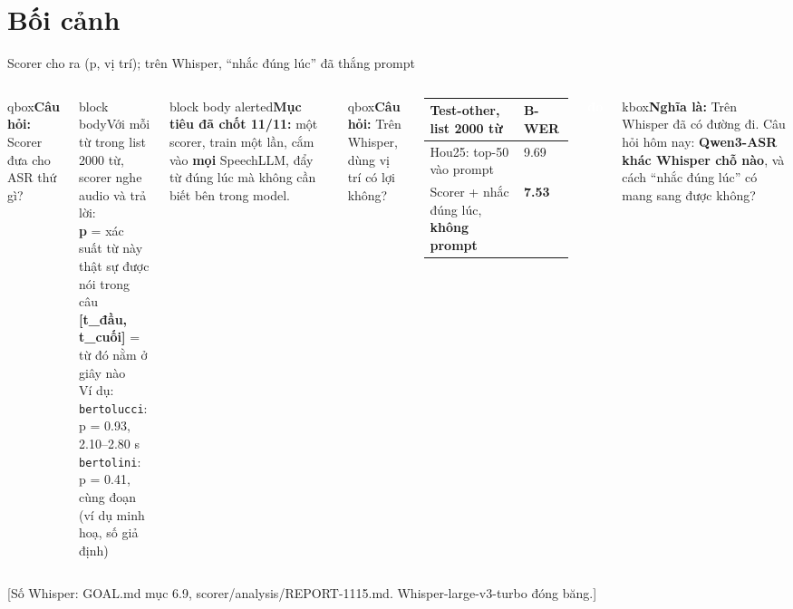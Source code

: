 \documentclass[aspectratio=169,xcolor=table]{beamer}
\newcommand{\good}[1]{\textcolor{GoodGreen}{\textbf{#1}}}
\newcommand{\src}[1]{\par\vfill{\tiny\color{TextGray}[#1]}}
\newcommand{\bsz}{\footnotesize}%
\newcommand{\nbox}[2][block body]{\begin{beamercolorbox}[sep=0.45em,rounded=true]{#1}\bsz #2\end{beamercolorbox}}
\newcommand{\cauhoi}[1]{\begin{beamercolorbox}[sep=0.30em,rounded=true]{qbox}\bsz\textbf{Câu hỏi:} #1\end{beamercolorbox}\vspace{0.08cm}}
\newcommand{\nghiala}[1]{\begin{beamercolorbox}[sep=0.32em,rounded=true]{kbox}\bsz\textbf{Nghĩa là:} #1\end{beamercolorbox}}
\newcommand{\tagbox}[2]{{\scriptsize\colorbox{#1}{\textcolor{white}{\textbf{#2}}}}}
\newcommand{\DO}{\tagbox{GoodGreen}{đo}}
\begin{document}
\section{Bối cảnh}
\begin{frame}{Scorer cho ra (p, vị trí); trên Whisper, ``nhắc đúng lúc'' đã thắng prompt}
\begin{columns}[T]
\cauhoi{Scorer đưa cho ASR thứ gì?}
\nbox{Với mỗi từ trong list 2000 từ, scorer nghe audio và trả lời:\\[3pt]
\textbf{p} = xác suất từ này thật sự được nói trong câu\\
\textbf{[t\_đầu, t\_cuối]} = từ đó nằm ở giây nào\\[4pt]
Ví dụ: \texttt{bertolucci}: p = 0.93, 2.10--2.80 s\\
\hspace*{3.6em}\texttt{bertolini}: p = 0.41, cùng đoạn\\
{\scriptsize\color{TextGray}(ví dụ minh hoạ, số giả định)}}
\vspace{0.1cm}
\nbox[block body alerted]{\textbf{Mục tiêu đã chốt 11/11:} một scorer, train một lần, cắm vào \textbf{mọi} SpeechLLM, đẩy từ đúng lúc mà không cần biết bên trong model.}
\cauhoi{Trên Whisper, dùng vị trí có lợi không?}
\renewcommand{\arraystretch}{1.15}\footnotesize
\begin{tabular}{L{3.6cm}C{1.5cm}}
\toprule
Test-other, list 2000 từ & B-WER \\
\midrule
Hou25: top-50 vào prompt & 9.69 \\
Scorer + nhắc đúng lúc, \textbf{không prompt} & \good{7.53} \\
\bottomrule
\end{tabular}
\DO
\vspace{0.15cm}

\nghiala{Trên Whisper đã có đường đi. Câu hỏi hôm nay: \textbf{Qwen3-ASR khác Whisper chỗ nào}, và cách ``nhắc đúng lúc'' có mang sang được không?}
\end{columns}
\src{Số Whisper: GOAL.md mục 6.9, scorer/analysis/REPORT-1115.md. Whisper-large-v3-turbo đóng băng.}
\end{frame}

\end{document}
